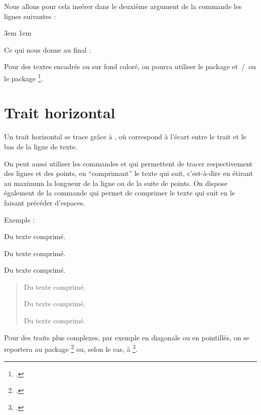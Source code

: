 Nous allons pour cela insérer dans le deuxième argument de la commande  les lignes suivantes :

\begin{latexcode}
\leftmargin 3em
\rightmargin 1em
\itshape
\end{latexcode}

Ce qui nous donne au final :

\begin{latexcode}
\makeatletter
\newenvironment{exemple}
               {\list{}{\listparindent 1.5em%
                        \itemindent    \listparindent
                        \leftmargin 3em
            \rightmargin 1em
            \itshape
                        \parsep        \z@ \@plus\p@}%
                \item\relax}
               {\endlist}
\makeatother
\end{latexcode}

\begin{plusloins}
Pour des textes encadrés ou sur fond coloré, on pourra utiliser le package  et~/~ou le package \footcite[On peut également consulter, si on aime les défis de codage en \TeX~/~\LaTeX,][]{frama_boites}.
\end{plusloins}

\section{Trait horizontal}\label{filets}

Un trait horizontal se trace grâce à , où  correspond à l'écart entre le trait et le bas de la ligne de texte.

On peut aussi utiliser les commandes  et  qui permettent de tracer respectivement des lignes et des points, en \enquote{comprimant} le texte qui suit, c'est-à-dire en étirant au maximum la longueur de la ligne ou de la suite de points. On dispose également de la commande \label{hfill} qui permet de comprimer le texte qui suit en le faisant précéder d'espaces.

Exemple :

\begin{latexcode}
\hfill Du texte comprimé.

\hrulefill Du texte comprimé.

\dotfill Du texte comprimé.
\end{latexcode}

\begin{quotation}
\hfill Du texte comprimé.

\hrulefill Du texte comprimé.

\dotfill Du texte comprimé.
\end{quotation}

Pour des traits plus complexes, par exemple en diagonale ou en pointillés, on se reportera au package \footcite{eepic} ou, selon le cas, à \footcite{tikz}.



